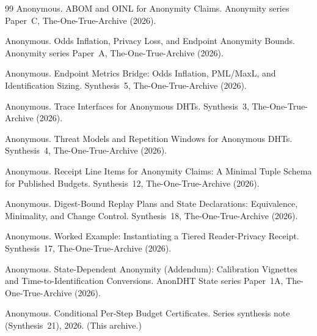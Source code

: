 \documentclass[11pt]{article}
\begin{document}
\begin{thebibliography}{99}
Anonymous.
\newblock ABOM and OINL for Anonymity Claims.
\newblock Anonymity series Paper~C, The-One-True-Archive (2026).

Anonymous.
\newblock Odds Inflation, Privacy Loss, and Endpoint Anonymity Bounds.
\newblock Anonymity series Paper~A, The-One-True-Archive (2026).

Anonymous.
\newblock Endpoint Metrics Bridge: Odds Inflation, PML/MaxL, and Identification Sizing.
\newblock Synthesis~5, The-One-True-Archive (2026).

Anonymous.
\newblock Trace Interfaces for Anonymous DHTs.
\newblock Synthesis~3, The-One-True-Archive (2026).

Anonymous.
\newblock Threat Models and Repetition Windows for Anonymous DHTs.
\newblock Synthesis~4, The-One-True-Archive (2026).

Anonymous.
\newblock Receipt Line Items for Anonymity Claims: A Minimal Tuple Schema for Published Budgets.
\newblock Synthesis~12, The-One-True-Archive (2026).

Anonymous.
\newblock Digest-Bound Replay Plans and State Declarations: Equivalence, Minimality, and Change Control.
\newblock Synthesis~18, The-One-True-Archive (2026).

Anonymous.
\newblock Worked Example: Instantiating a Tiered Reader-Privacy Receipt.
\newblock Synthesis~17, The-One-True-Archive (2026).

Anonymous.
\newblock State-Dependent Anonymity (Addendum): Calibration Vignettes and Time-to-Identification Conversions.
\newblock AnonDHT State series Paper~1A, The-One-True-Archive (2026).


Anonymous.
\newblock Conditional Per-Step Budget Certificates.
\newblock Series synthesis note (Synthesis~21), 2026. (This archive.)

\end{thebibliography}
\end{document}

